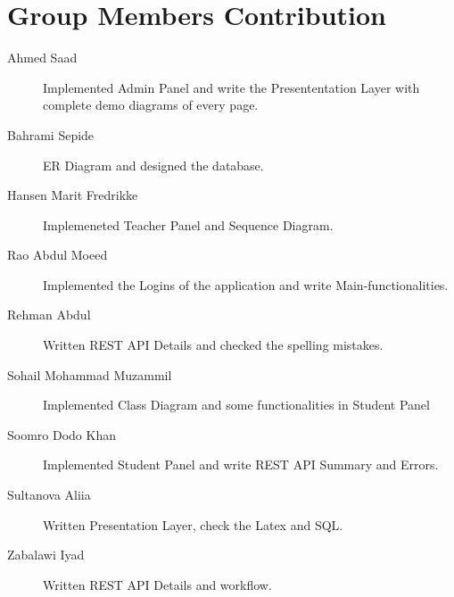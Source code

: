 \section{Group Members Contribution}


\begin{description}

	\item[Ahmed Saad] Implemented Admin Panel and write the Presententation Layer with complete demo diagrams of every page.
	\item[Bahrami Sepide] ER Diagram and designed the database.
	\item[Hansen Marit Fredrikke] Implemeneted Teacher Panel and Sequence Diagram.
	\item[Rao Abdul Moeed] Implemented the Logins of the application and write Main-functionalities. 
	\item[Rehman Abdul] Written REST API Details and checked the spelling mistakes.
	\item[Sohail Mohammad Muzammil] Implemented Class Diagram and some functionalities in Student Panel
	\item[Soomro Dodo Khan] Implemented Student Panel and write REST API Summary and Errors.
	\item[Sultanova Aliia]  Written Presentation Layer, check the Latex and SQL.
	\item[Zabalawi Iyad] Written REST API Details and workflow.
\end{description}
